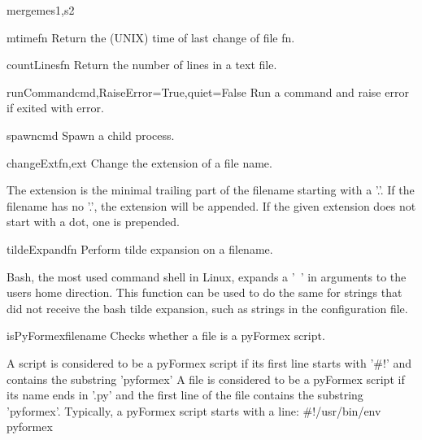 \begin{funcdesc}{mergeme}{s1,s2}


\end{funcdesc}


\begin{funcdesc}{mtime}{fn}
Return the (UNIX) time of last change of file fn.

\end{funcdesc}


\begin{funcdesc}{countLines}{fn}
Return the number of lines in a text file.

\end{funcdesc}


\begin{funcdesc}{runCommand}{cmd,RaiseError=True,quiet=False}
Run a command and raise error if exited with error.

\end{funcdesc}


\begin{funcdesc}{spawn}{cmd}
Spawn a child process.

\end{funcdesc}


\begin{funcdesc}{changeExt}{fn,ext}
Change the extension of a file name.

    The extension is the minimal trailing part of the filename starting
    with a '.'. If the filename has no '.', the extension will be appended.
    If the given extension does not start with a dot, one is prepended.
    

\end{funcdesc}


\begin{funcdesc}{tildeExpand}{fn}
Perform tilde expansion on a filename.

    Bash, the most used command shell in Linux, expands a '~' in arguments
    to the users home direction.
    This function can be used to do the same for strings that did not receive
    the bash tilde expansion, such as strings in the configuration file.
    

\end{funcdesc}


\begin{funcdesc}{isPyFormex}{filename}
Checks whether a file is a pyFormex script.

    A script is considered to be a pyFormex script if its first line
    starts with '\#!' and contains the substring 'pyformex'
    A file is considered to be a pyFormex script if its name ends in '.py'
    and the first line of the file contains the substring 'pyformex'.
    Typically, a pyFormex script starts with a line:
      \#!/usr/bin/env pyformex
    

\end{funcdesc}


